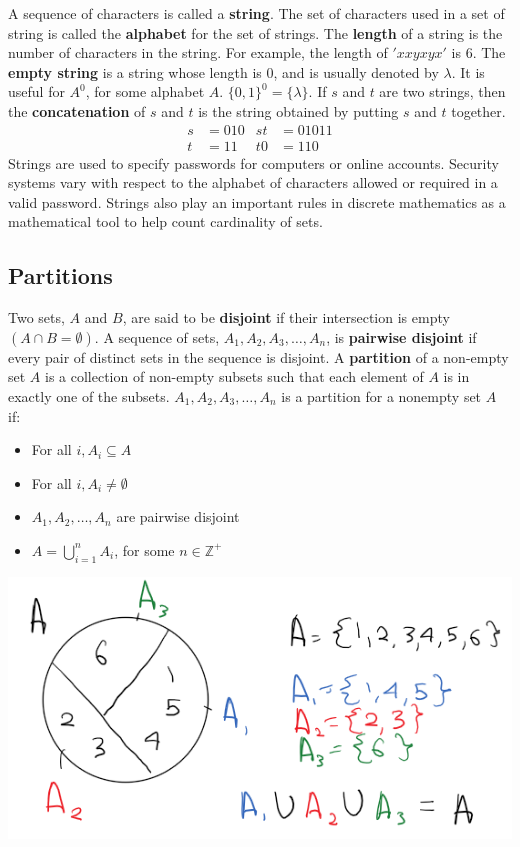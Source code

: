 A sequence of characters is called a \textbf{string}.
The set of characters used in a set of string is called the \textbf{alphabet} for the set of strings.
The \textbf{length} of a string is the number of characters in the string.
For example, the length of $'xxyxyx'$ is $6$.
The \textbf{empty string} is a string whose length is $0$, and is usually denoted by $\lambda$.
It is useful for $A^0$, for some alphabet $A$. $\{0, 1\}^0 = \{\lambda\}$.
If $s$ and $t$ are two strings, then the \textbf{concatenation} of $s$ and $t$ is the string obtained by putting $s$ and $t$ together.
\begin{align*}
  s & = 010 & st & = 01011 \\
  t & = 11  & t0 & = 110
\end{align*}
Strings are used to specify passwords for computers or online accounts.
Security systems vary with respect to the alphabet of characters allowed or required in a valid password.
Strings also play an important rules in discrete mathematics as a mathematical tool to help count cardinality of sets.

\subsection{Partitions}

Two sets, $A$ and $B$, are said to be \textbf{disjoint} if their intersection is empty $(A \cap B = \emptyset)$.
A sequence of sets, $A_1, A_2, A_3, \ldots, A_n$, is \textbf{pairwise disjoint} if every pair of distinct sets in the sequence is disjoint.
A \textbf{partition} of a non-empty set $A$ is a collection of non-empty subsets such that each element of $A$ is in exactly one of the subsets.
$A_1, A_2, A_3, \ldots, A_n$ is a partition for a nonempty set $A$ if:
\begin{itemize}
  \item For all $i, A_i \subseteq A$
  \item For all $i, A_i \not = \emptyset$
  \item $A_1, A_2, \ldots, A_n$ are pairwise disjoint
  \item $A = \bigcup_{i=1}^{n} A_i$, for some $n \in \mathbb{Z}^+$
\end{itemize}
\begin{center}
  \includegraphics[width=.6\linewidth]{partitions.png}
\end{center}